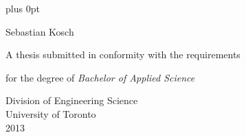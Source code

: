 \fontsize{12pt}{16pt}\selectfont
\thispagestyle{empty}
\pagestyle{fancy}

\baselineskip=16.8pt plus 0pt
\frenchspacing

\begin{centering}
\vspace{3em}
\LARGE{}

\vspace{2em}
\large
\sansfont Sebastian Kosch

\vfill
\normalfont
\fontsize{12pt}{16pt}\selectfont
A thesis submitted in conformity with the requirements

for the degree of \textit{Bachelor of Applied Science}

\vspace{2em}

\textmd Division of Engineering Science\\
University of Toronto\\

2013

\end{centering}
\pagebreak